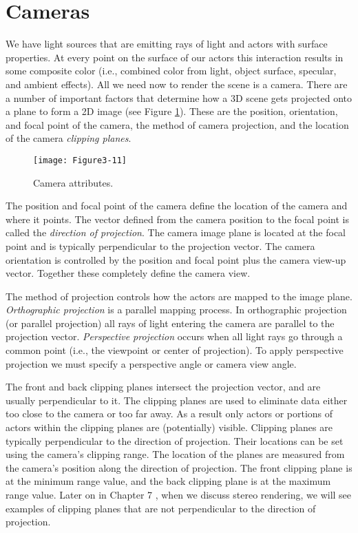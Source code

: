 \section{Cameras}
\label{sec:cameras}

We have light sources that are emitting rays of light and actors with surface properties. At every point on the surface of our actors this interaction results in some composite color (i.e., combined color from light, object surface, specular, and ambient effects). All we need now to render the scene is a camera. There are a number of important factors that determine how a 3D scene gets projected onto a plane to form a 2D image (see Figure \ref{fig:Figure3-11}). These are the position, orientation, and focal point of the camera, the method of camera projection, and the location of the camera \emph{clipping planes}.

\begin{figure}[!htb]
  \centering
  \texttt{[image: Figure3-11]}\\
  \caption{Camera attributes.}\label{fig:Figure3-11}
\end{figure}

The position and focal point of the camera define the location of the camera and where it points. The vector defined from the camera position to the focal point is called the \emph{direction of projection}. The camera image plane is located at the focal point and is typically perpendicular to the projection vector. The camera orientation is controlled by the position and focal point plus the camera view-up vector. Together these completely define the camera view. 

The method of projection controls how the actors are mapped to the image plane. \emph{Orthographic projection} is a parallel mapping process. In orthographic projection (or parallel projection) all rays of light entering the camera are parallel to the projection vector. \emph{Perspective projection} occurs when all light rays go through a common point (i.e., the viewpoint or center of projection). To apply perspective projection we must specify a perspective angle or camera view angle.

The front and back clipping planes intersect the projection vector, and are usually perpendicular to it. The clipping planes are used to eliminate data either too close to the camera or too far away. As a result only actors or portions of actors within the clipping planes are (potentially) visible. Clipping planes are typically perpendicular to the direction of projection. Their locations can be set using the camera's clipping range. The location of the planes are measured from the camera's position along the direction of projection. The front clipping plane is at the minimum range value, and the back clipping plane is at the maximum range value. Later on in Chapter 7 , when we discuss stereo rendering, we will see examples of clipping planes that are not perpendicular to the direction of projection.

